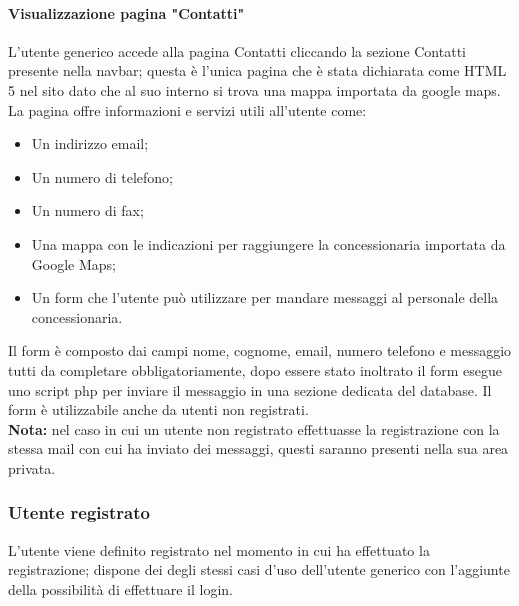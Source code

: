         \paragraph{Visualizzazione pagina "Contatti"}
        L’utente generico accede alla pagina Contatti cliccando la sezione Contatti presente nella navbar; questa è l'unica pagina che è stata dichiarata come HTML 5 nel sito dato che al suo interno si trova una mappa importata da google maps. La pagina offre informazioni e servizi utili all’utente come:
        \begin{itemize}
            \item Un indirizzo email;
            \item Un numero di telefono;
            \item Un numero di fax;
            \item Una mappa con le indicazioni per raggiungere la concessionaria importata da Google Maps;
            \item Un form che l’utente può utilizzare per mandare messaggi al personale della concessionaria.
        \end{itemize}
        Il form è composto dai campi nome, cognome, email, numero telefono e messaggio tutti da completare obbligatoriamente, dopo essere stato inoltrato il form esegue uno script php per inviare il messaggio in una sezione dedicata del database. Il form è utilizzabile anche da utenti non registrati. \\
        \textbf{Nota:} nel caso in cui un utente non registrato effettuasse la registrazione con la stessa mail con cui ha inviato dei messaggi, questi saranno presenti nella sua area privata.

        \subsubsection{Utente registrato}
        L’utente viene definito registrato nel momento in cui ha effettuato la registrazione; dispone dei degli stessi casi  d’uso dell'utente generico con l'aggiunte della possibilità di effettuare il login.


